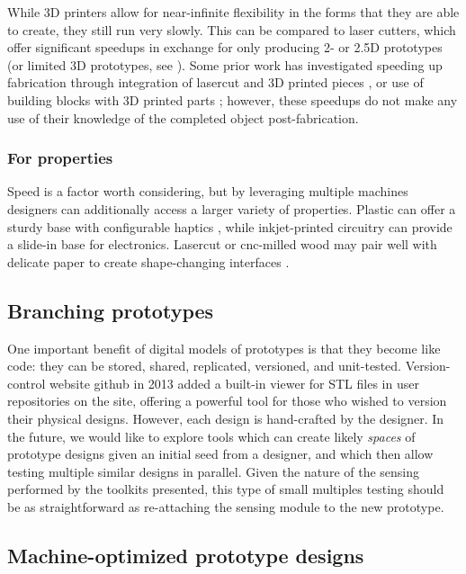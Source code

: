    While 3D printers allow for near-infinite flexibility in the forms that they are able to create, they still run very slowly. This can be compared to laser cutters, which offer significant speedups in exchange for only producing 2- or 2.5D prototypes (or limited 3D prototypes, see \cite{mueller-laserorigami}). Some prior work has investigated speeding up fabrication through integration of lasercut and 3D printed pieces \cite{beyer-platener}, or use of building blocks with 3D printed parts \cite{mueller-fabrickation}; however, these speedups do not make any use of their knowledge of the completed object post-fabrication.

    \subsubsection{For properties}
    
    Speed is a factor worth considering, but by leveraging multiple machines designers can additionally access a larger variety of properties. Plastic can offer a sturdy base with configurable haptics \cite{torres-hapticprint}, while inkjet-printed circuitry can provide a slide-in base for electronics. Lasercut or cnc-milled wood may pair well with delicate paper to create shape-changing interfaces \cite{yao-pneui}.

\subsection{Branching prototypes}

One important benefit of digital models of prototypes is that they become like code: they can be stored, shared, replicated, versioned, and unit-tested. Version-control website github \cite{github} in 2013 added a built-in viewer for STL files in user repositories on the site, offering a powerful tool for those who wished to version their physical designs. However, each design is hand-crafted by the designer. In the future, we would like to explore tools which can create likely \emph{spaces} of prototype designs given an initial seed from a designer, and which then allow testing multiple similar designs in parallel. Given the nature of the sensing performed by the toolkits presented, this type of small multiples testing should be as straightforward as re-attaching the sensing module to the new prototype.

\subsection{Machine-optimized prototype designs}

